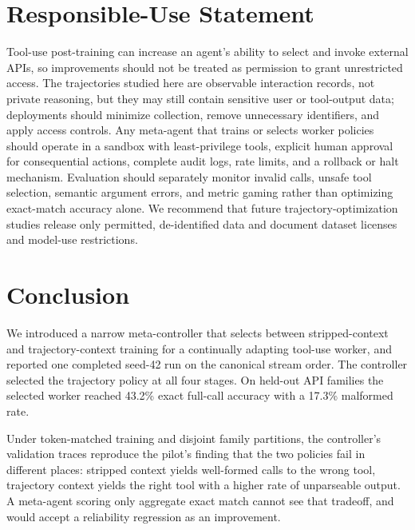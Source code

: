 \documentclass{article}
\begin{document}
\section{Responsible-Use Statement}

Tool-use post-training can increase an agent's ability to select and invoke external APIs, so improvements should not be treated as permission to grant unrestricted access. The trajectories studied here are observable interaction records, not private reasoning, but they may still contain sensitive user or tool-output data; deployments should minimize collection, remove unnecessary identifiers, and apply access controls. Any meta-agent that trains or selects worker policies should operate in a sandbox with least-privilege tools, explicit human approval for consequential actions, complete audit logs, rate limits, and a rollback or halt mechanism. Evaluation should separately monitor invalid calls, unsafe tool selection, semantic argument errors, and metric gaming rather than optimizing exact-match accuracy alone. We recommend that future trajectory-optimization studies release only permitted, de-identified data and document dataset licenses and model-use restrictions.

\section{Conclusion}

We introduced a narrow meta-controller that selects between stripped-context and trajectory-context training for a continually adapting tool-use worker, and reported one completed seed-42 run on the canonical stream order. The controller selected the trajectory policy at all four stages. On held-out API families the selected worker reached 43.2\% exact full-call accuracy with a 17.3\% malformed rate.

Under token-matched training and disjoint family partitions, the controller's validation traces reproduce the pilot's finding that the two policies fail in different places: stripped context yields well-formed calls to the wrong tool, trajectory context yields the right tool with a higher rate of unparseable output. A meta-agent scoring only aggregate exact match cannot see that tradeoff, and would accept a reliability regression as an improvement.
\end{document}

